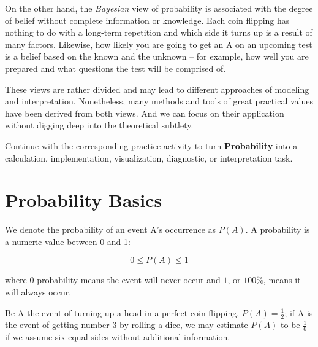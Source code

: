 \documentclass[
  letterpaper,
]{scrbook}
\begin{document}
On the other hand, the \emph{Bayesian} view of probability is associated
with the degree of belief without complete information or knowledge.
Each coin flipping has nothing to do with a long-term repetition and
which side it turns up is a result of many factors. Likewise, how likely
you are going to get an A on an upcoming test is a belief based on the
known and the unknown -- for example, how well you are prepared and what
questions the test will be comprised of.

These views are rather divided and may lead to different approaches of
modeling and interpretation. Nonetheless, many methods and tools of
great practical values have been derived from both views. And we can
focus on their application without digging deep into the theoretical
subtlety.

\begin{tcolorbox}[enhanced jigsaw, arc=.35mm, bottomrule=.15mm, bottomtitle=1mm, breakable, colback=white, colbacktitle=quarto-callout-tip-color!10!white, colframe=quarto-callout-tip-color-frame, coltitle=black, left=2mm, leftrule=.75mm, opacityback=0, opacitybacktitle=0.6, rightrule=.15mm, title=\textcolor{quarto-callout-tip-color}{\faLightbulb}\hspace{0.5em}{Put it into practice}, titlerule=0mm, toprule=.15mm, toptitle=1mm]

Continue with \hyperref[sec-pr-04-probability]{the corresponding
practice activity} to turn \textbf{Probability} into a calculation,
implementation, visualization, diagnostic, or interpretation task.

\end{tcolorbox}

\section{Probability Basics}\label{probability-basics}

We denote the probability of an event A's occurrence as \(P(A)\). A
probability is a numeric value between 0 and 1:

\[
0 \le P(A) \le 1
\]

where \(0\) probability means the event will never occur and \(1\), or
\(100\%\), means it will always occur.

Be A the event of turning up a head in a perfect coin flipping,
\(P(A)=\frac{1}{2}\); if A is the event of getting number \(3\) by
rolling a dice, we may estimate \(P(A)\) to be \(\frac{1}{6}\) if we
assume six equal sides without additional information.
\end{document}
